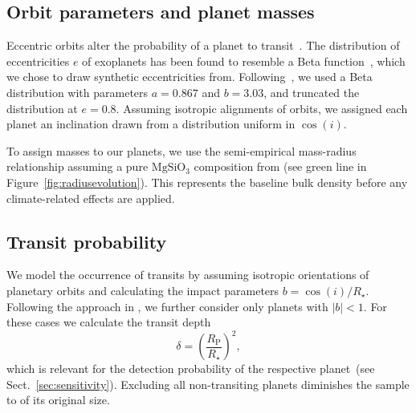 \documentclass[twocolumn,twocolappendix]{aastex631}
\begin{document}
\subsection{Orbit parameters and planet masses}\label{sec:met-orbits_masses}
Eccentric orbits alter the probability of a planet to transit~\citep[e.g.,][]{Barnes2007a}.
The distribution of eccentricities $e$ of exoplanets has been found to resemble a Beta function~\citep{Kipping2013b}, which we chose to draw synthetic eccentricities from.
Following~\citet{Kipping2013b}, we used a Beta distribution with parameters $a=0.867$ and $b=3.03$, and truncated the distribution at $e = 0.8$.
Assuming isotropic alignments of orbits, we assigned each planet an inclination drawn from a distribution uniform in $\cos(i)$.

To assign masses to our planets, we use the semi-empirical mass-radius relationship assuming a pure $\mathrm{MgSiO_3}$ composition from \citet{Zeng2016} (see green line in Figure~\ref{fig:radiusevolution}).
This represents the baseline bulk density before any climate-related effects are applied.


\subsection{Transit probability}
We model the occurrence of transits by assuming isotropic orientations of planetary orbits and calculating the impact parameters $b = \cos(i)/R_\star$.
Following the approach in \citet{Bixel2021}, we further consider only planets with $|b| < 1$.
For these cases we calculate the transit depth
\begin{equation}\label{eq:transitdepth}
    \delta = \left( \frac{R_\mathrm{P}}{R_\star} \right)^2,
\end{equation}
which is relevant for the detection probability of the respective planet~(see Sect.~\ref{sec:sensitivity}).
Excluding all non-transiting planets diminishes the sample to  of its original size.
\end{document}
